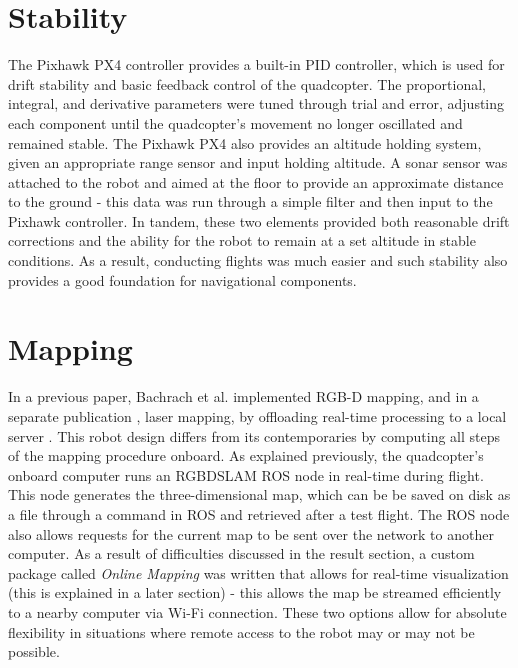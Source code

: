 \documentclass[letterpaper, oneside, 10pt]{report}
\begin{document}
\section{Stability}
The Pixhawk PX4 controller provides a built-in PID controller, which is used for drift stability and basic feedback control of the quadcopter. The proportional, integral, and derivative parameters were tuned through trial and error, adjusting each component until the quadcopter's movement no longer oscillated and remained stable. The Pixhawk PX4 also provides an altitude holding system, given an appropriate range sensor and input holding altitude. A sonar sensor was attached to the robot and aimed at the floor to provide an approximate distance to the ground - this data was run through a simple filter and then input to the Pixhawk controller. In tandem, these two elements provided both reasonable drift corrections and the ability for the robot to remain at a set altitude in stable conditions. As a result, conducting flights was much easier and such stability also provides a good foundation for navigational components.

\section{Mapping}
In a previous paper, Bachrach et al. implemented RGB-D mapping, and in a separate publication \cite{bachrach2011range}, laser mapping, by offloading real-time processing to a local server \cite{bachrach2012estimation}.  This robot design differs from its contemporaries by computing all steps of the mapping procedure onboard. As explained previously, the quadcopter's onboard computer runs an RGBDSLAM ROS node in real-time during flight. This node generates the three-dimensional map, which can be be saved on disk as a file through a command in ROS and retrieved after a test flight. The ROS node also allows requests for the current map to be sent over the network to another computer. As a result of difficulties discussed in the result section, a custom package called \textsl{Online Mapping} was written that allows for real-time visualization (this is explained in a later section) - this allows the map be streamed efficiently to a nearby computer via Wi-Fi connection. These two options allow for absolute flexibility in situations where remote access to the robot may or may not be possible.
\end{document}
